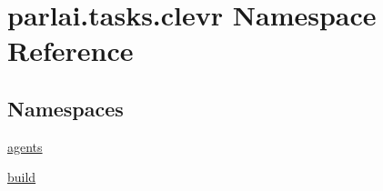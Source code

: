 \hypertarget{namespaceparlai_1_1tasks_1_1clevr}{}\section{parlai.\+tasks.\+clevr Namespace Reference}
\label{namespaceparlai_1_1tasks_1_1clevr}
\subsection*{Namespaces}
\begin{DoxyCompactItemize}
\item 
 \hyperlink{namespaceparlai_1_1tasks_1_1clevr_1_1agents}{agents}
\item 
 \hyperlink{namespaceparlai_1_1tasks_1_1clevr_1_1build}{build}
\end{DoxyCompactItemize}
